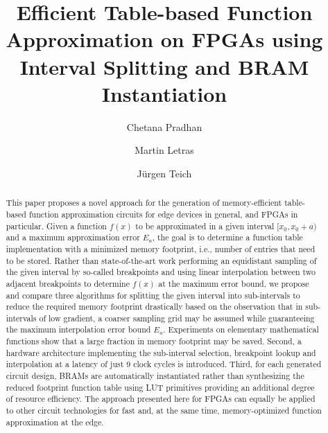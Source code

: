 \documentclass[acmsmall]{acmart}
\newcommand{\AbsError}{E_a}
\newcommand{\Fx}{f(x)}
\begin{document}
\title[E. Table-based Func. Approx. on FPGAs using Int. Splitting and BRAM Instantiation]{Efficient Table-based Function Approximation on FPGAs using Interval Splitting and BRAM Instantiation}
%
\author{Chetana Pradhan}
\author{Martin Letras}
\author{J{\"u}rgen Teich}
\renewcommand{\shortauthors}{Pradhan, Letras and Teich}
\begin{abstract}
This paper proposes a novel approach for the generation of memory-efficient table-based function approximation circuits for edge devices in general, and FPGAs in particular.
Given a function $f(x)$ to be approximated in a given interval $[x_0, x_0+a)$ and a maximum approximation error $\AbsError$, the goal is to determine a function table implementation with a minimized memory footprint, i.e., number of entries that need to be stored.
Rather than state-of-the-art work performing an equidistant sampling of the given interval by so-called breakpoints and using linear interpolation between two adjacent breakpoints to determine $\Fx$ at the maximum error bound, we propose and compare three algorithms for splitting the given interval into sub-intervals to reduce the required memory footprint drastically based on the observation that in sub-intervals of low gradient, a coarser sampling grid may be assumed while guaranteeing the maximum interpolation error bound $\AbsError$.
Experiments on elementary mathematical functions show that a large fraction in memory footprint may be saved.
Second, a hardware architecture implementing the sub-interval selection, breakpoint lookup and interpolation at a latency of just 9 clock cycles is introduced.
Third, for each generated circuit design, BRAMs are automatically instantiated rather than synthesizing the reduced footprint function table using LUT primitives providing an additional degree of resource efficiency.
The approach presented here for FPGAs can equally be applied to other circuit technologies for fast and, at the same time, memory-optimized function approximation at the edge.\\
\end{abstract}
\end{document}
